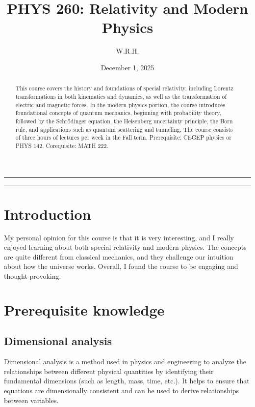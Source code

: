 \documentclass{article}
\begin{document}
\title{PHYS 260: Relativity and Modern Physics}
\author{W.R.H.}
\date{December 1, 2025}
\setcounter{Maxaffil}{0}
\renewcommand\Affilfont{\itshape\small}
\maketitle

\noindent\rule{\textwidth}{0.4pt}
\thispagestyle{empty}
\begin{abstract}
\noindent This course covers the history and foundations of special relativity, including Lorentz transformations in both kinematics and dynamics, as well as the transformation of electric and magnetic forces. In the modern physics portion, the course introduces foundational concepts of quantum mechanics, beginning with probability theory, followed by the Schrödinger equation, the Heisenberg uncertainty principle, the Born rule, and applications such as quantum scattering and tunneling. The course consists of three hours of lectures per week in the Fall term. Prerequisite: CEGEP physics or PHYS 142. Corequisite: MATH 222.
\end{abstract}
\noindent\rule{\textwidth}{0.4pt}
\clearpage

\thispagestyle{empty}
\tableofcontents
\clearpage

\setcounter{page}{1}
\section{Introduction}
My personal opinion for this course is that it is very interesting, and I really enjoyed learning about both special relativity and modern physics. The concepts are quite different from classical mechanics, and they challenge our intuition about how the universe works. Overall, I found the course to be engaging and thought-provoking.
\section{Prerequisite knowledge}
\subsection{Dimensional analysis}
Dimensional analysis is a method used in physics and engineering to analyze the relationships between different physical quantities by identifying their fundamental dimensions (such as length, mass, time, etc.). It helps to ensure that equations are dimensionally consistent and can be used to derive relationships between variables.
\end{document}

